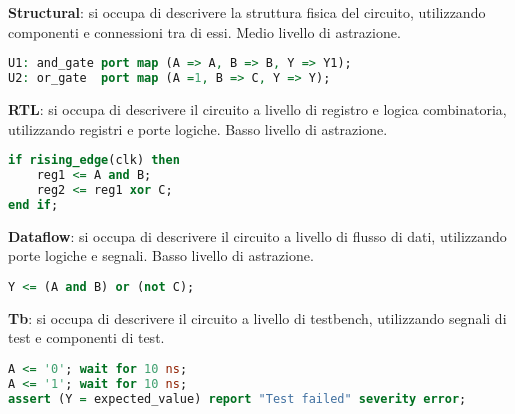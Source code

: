             \textbf{Structural}: si occupa di descrivere la struttura fisica del circuito, utilizzando componenti e connessioni tra di essi. Medio livello di astrazione.
            \begin{lstlisting}[language=VHDL]
U1: and_gate port map (A => A, B => B, Y => Y1);
U2: or_gate  port map (A =1, B => C, Y => Y);
            \end{lstlisting}

            \textbf{RTL}: si occupa di descrivere il circuito a livello di registro e logica combinatoria, utilizzando registri e porte logiche. Basso livello di astrazione.
            \begin{lstlisting}[language=VHDL]
if rising_edge(clk) then
    reg1 <= A and B;
    reg2 <= reg1 xor C;
end if;
            \end{lstlisting}

            \textbf{Dataflow}: si occupa di descrivere il circuito a livello di flusso di dati, utilizzando porte logiche e segnali. Basso livello di astrazione.
            \begin{lstlisting}[language=VHDL]
Y <= (A and B) or (not C);
            \end{lstlisting}

            \textbf{Tb}: si occupa di descrivere il circuito a livello di testbench, utilizzando segnali di test e componenti di test.
            \begin{lstlisting}[language=VHDL]
A <= '0'; wait for 10 ns;
A <= '1'; wait for 10 ns;
assert (Y = expected_value) report "Test failed" severity error;
            \end{lstlisting}

